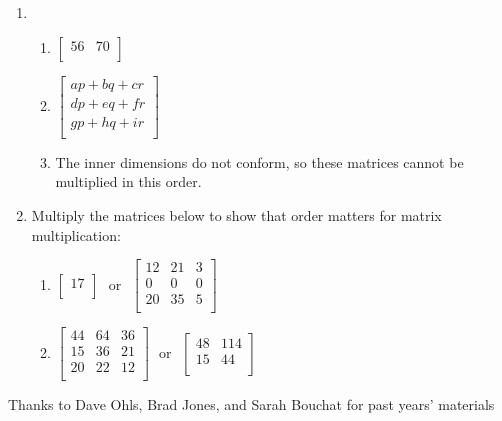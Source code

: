 \documentclass[11pt]{article}
\begin{document}
\begin{enumerate}
\item 
\begin{enumerate}
\item $\left[\begin{array}{cc}
56 & 70 \\
\end{array}\right]$
\item $
\left[\begin{array}{c}
ap + bq + cr \\
dp + eq + fr \\
gp + hq + ir \\
\end{array}\right]$
\item The inner dimensions do not conform, so these matrices cannot be multiplied in this order.
\end{enumerate}




\item Multiply the matrices below to show that order matters for matrix multiplication: \\

\begin{enumerate}
\item $\left[\begin{array}{c}
17 \\
\end{array}\right]
~~~\textrm{or}~~~
\left[\begin{array}{ccc}
12 & 21 & 3 \\
0  & 0  & 0 \\
20 & 35 & 5 \\
\end{array}\right]$
\item $\left[\begin{array}{ccc}
44 & 64 & 36 \\
15 & 36 & 21 \\
20 & 22 & 12 \\
\end{array}\right]
~~~\textrm{or}~~~
\left[\begin{array}{cc}
48 & 114 \\
15 & 44 \\
\end{array}\right]$
\end{enumerate}







\end{enumerate}




\vfill
\begin{center}
\small{Thanks to Dave Ohls, Brad Jones, and Sarah Bouchat for past years' materials}
\end{center}
\end{document}

